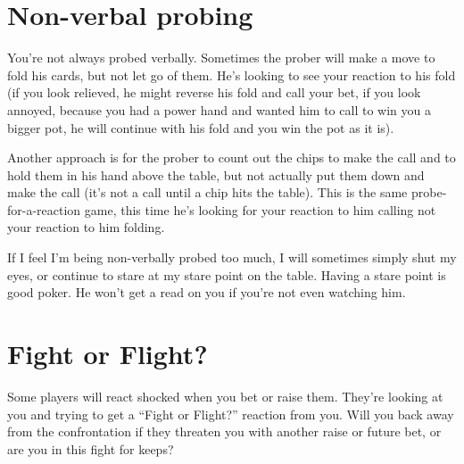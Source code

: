 \section{Non-verbal probing}

You're not always probed verbally. Sometimes the prober
will make a move to fold his cards, but not let go of them. He's looking
to see your reaction to his fold (if you look relieved, he might reverse
his fold and call your bet, if you look annoyed, because you had a power
hand and wanted him to call to win you a bigger pot, he will continue
with his fold and you win the pot as it is).

Another approach is for the prober to count out the chips to make
the call and to hold them in his hand above the table, but not
actually put them down and make the call (it's not a call until a chip
hits the table). This is the same probe-for-a-reaction game, this time
he's looking for your reaction to him calling not your reaction to him
folding.

If I feel I'm being non-verbally probed too much, I will sometimes
simply shut my eyes, or continue to stare at my stare point on the
table. Having a stare point is good poker. He won't get a read on
you if you're not even watching him.

\section{Fight or Flight?}

Some players will react shocked when you bet or raise them. They're
looking at you and trying to get a ``Fight or Flight?'' reaction from
you. Will you back away from the confrontation if they threaten you
with another raise or future bet, or are you in this fight for keeps?
